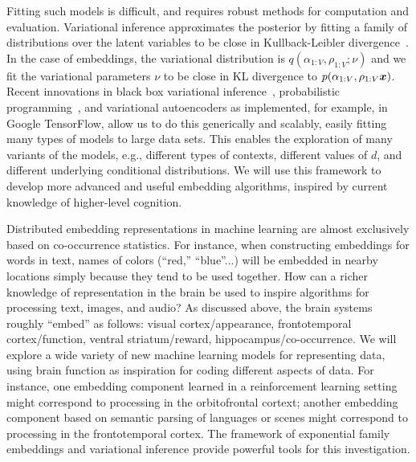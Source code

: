 Fitting such models is difficult, and requires robust methods for
computation and evaluation.  Variational inference approximates the
posterior by fitting a family of distributions over the latent
variables to be close in Kullback-Leibler
divergence~\citep{Jordan:1999,Blei:2017}.  In the case of embeddings,
the variational distribution is $q(\alpha_{1:V}, \rho_{1:V} ; \nu)$
and we fit the variational parameters $\nu$ to be close in KL
divergence to $p(\alpha_{1:V}, \rho_{1:V} \g \mbx)$.  Recent
innovations in black box variational inference~\citep{Ranganath:2014},
probabilistic programming~\citep{Kucukelbir:2017,Tran:2017}, and
variational autoencoders
\citep{kingma} as implemented, for example, in Google TensorFlow, allow us to do this generically and
scalably, easily fitting many types of models to large
data sets.  This enables the exploration of many variants of the
models, e.g., different types of contexts, different values of $d$,
and different underlying conditional distributions. We will use
this framework to develop more advanced and useful embedding
algorithms, inspired by current knowledge of higher-level cognition.


Distributed embedding representations in machine learning are almost
exclusively based on co-occurrence statistics. For instance, when
constructing embeddings for words in text, names of colors (``red,''
``blue''...) will be embedded in nearby locations simply because they
tend to be used together. How can a richer knowledge of representation
in the brain be used to inspire algorithms for processing text,
images, and audio? As discussed above, the brain systems roughly
``embed'' as follows: visual cortex/appearance, frontotemporal
cortex/function, ventral striatum/reward, hippocampus/co-occurrence.
We will explore a wide variety of new machine learning models 
for representing data, using brain function as inspiration
for coding different aspects of data. For instance,
one embedding component learned in a reinforcement learning
setting might correspond to processing in the orbitofrontal cortext;
another embedding component based on semantic parsing of 
languages or scenes might correspond to processing in
the frontotemporal cortex. 
The framework of exponential family embeddings and variational
inference provide powerful tools for this investigation.





